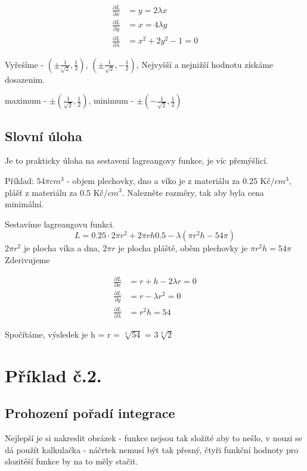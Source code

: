 \documentclass[12pt, letterpaper]{article}
\begin{document}
\[\begin{aligned}
\frac{\partial L}{\partial x} & = y = 2\lambda x\\
\frac{\partial L}{\partial y} & = x = 4\lambda y\\
\frac{\partial L}{\partial \lambda} &= x^2 + 2y^2 -1 = 0
\end{aligned}\]

Vyřešíme - $(\pm \frac{1}{\sqrt{2}}, \frac{1}{2} )$, $(\pm \frac{1}{\sqrt{2}}, -\frac{1}{2})$, Nejvyšší a nejnižší hodnotu získáme dosazenim.

maximum - $\pm(\frac{1}{\sqrt{2}}, \frac{1}{2} )$,  minimum - $\pm( - \frac{1}{\sqrt{2}}, \frac{1}{2} )$

\subsection*{Slovní úloha}
Je to prakticky úloha na sestavení lagreangovy funkce, je víc přemýšlicí.
\newline


Příklad: $54\pi cm^3$ - objem plechovky, dno a víko je z materiálu za 0.25 Kč/$cm^3$, plášť z materiálu za 0.5 Kč/$cm^3$. Nalezněte rozměry, tak aby byla cena minimální.

Sestavíme lagreangovu funkci.
\[L = 0.25\cdot 2 \pi r^2 + 2\pi r h 0.5 - \lambda(\pi r^2 h - 54 \pi)\]
$2 \pi r^2$ je plocha víka a dna, $ 2 \pi r $ je plocha pláště, oběm plechovky je $\pi r^2 h = 54 \pi$
Zderivujeme

\[\begin{aligned}
\frac{\partial L}{\partial x} & = r + h -2 \lambda r = 0\\
\frac{\partial L}{\partial y} & = r - \lambda r^2= 0\\
\frac{\partial L}{\partial \lambda} &= r^2 h = 54
\end{aligned}\]

Spočítáme, výsledek je h = r = $\sqrt[3]{54}$ = $3\sqrt[3]{2}$


\section*{Příklad č.2.}

\subsection*{Prohození pořadí integrace}

Nejlepší je si nakreslit obrázek - funkce nejsou tak složité aby to nešlo, v nouzi se dá použít kalkulačka - náčrtek nemusí být tak přesný, čtyři funkční hodnoty pro slozitěší funkce by na to měly stačit.
\end{document}
